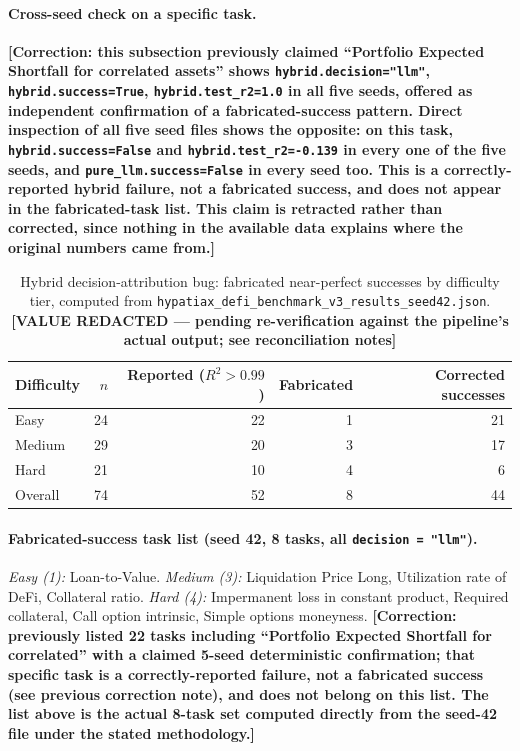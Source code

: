 \documentclass[twoside,11pt]{article}
\newcommand{\Rsq}{R^{2}}
\begin{document}
\paragraph{Cross-seed check on a specific task.}
\textbf{[Correction: this subsection previously claimed ``Portfolio
Expected Shortfall for correlated assets'' shows
\texttt{hybrid.decision="llm"}, \texttt{hybrid.success=True},
\texttt{hybrid.test\_r2=1.0} in all five seeds, offered as
independent confirmation of a fabricated-success pattern. Direct
inspection of all five seed files shows the opposite: on this task,
\texttt{hybrid.success=False} and \texttt{hybrid.test\_r2=-0.139} in
every one of the five seeds, and \texttt{pure\_llm.success=False} in
every seed too. This is a correctly-reported hybrid failure, not a
fabricated success, and does not appear in the fabricated-task list.
This claim is retracted rather than corrected, since nothing in the
available data explains where the original numbers came from.]}

\begin{table}[h]
\centering
\caption{Hybrid decision-attribution bug: fabricated near-perfect successes by
difficulty tier, computed from \texttt{hypatiax\_defi\_benchmark\_v3\_results\_seed42.json}.
\textbf{[VALUE REDACTED --- pending re-verification against the pipeline's actual output; see reconciliation notes]}}
\label{tab:hybrid-bug-breakdown}
\begin{tabular}{lrrrr}
\toprule
Difficulty & $n$ & Reported ($\Rsq>0.99$) & Fabricated & Corrected successes \\
\midrule
Easy    & 24 & 22 & 1 & 21 \\
Medium  & 29 & 20 & 3 & 17 \\
Hard    & 21 & 10 & 4 & 6 \\
\midrule
Overall & 74 & 52 & 8 & 44 \\
\bottomrule
\end{tabular}
\end{table}

\paragraph{Fabricated-success task list (seed 42, 8 tasks, all
\texttt{decision = "llm"}).} \emph{Easy (1):} Loan-to-Value.
\emph{Medium (3):} Liquidation Price Long, Utilization rate of DeFi,
Collateral ratio. \emph{Hard (4):} Impermanent loss in constant
product, Required collateral, Call option intrinsic, Simple options
moneyness.
\textbf{[Correction: previously listed 22 tasks including
``Portfolio Expected Shortfall for correlated'' with a claimed 5-seed
deterministic confirmation; that specific task is a correctly-reported
failure, not a fabricated success (see previous correction note), and
does not belong on this list. The list above is the actual 8-task set
computed directly from the seed-42 file under the stated methodology.]}
\end{document}
